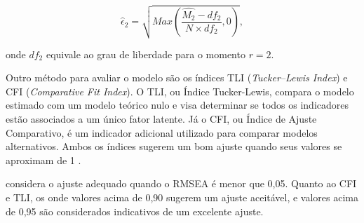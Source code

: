 \[
	\hat{\epsilon}_2 = \sqrt{Max\left(\frac{\hat{M_{2}} - df_{2}}
		{N \times df_{2}}, 0 \right) } ,
\]

\noindent onde $df_2$ equivale ao grau de liberdade para o momento $r = 2$.



\begin{comment}
	Outro método método para avaliar o modelo são os índices TLI  (\textit{Tucker–Lewis Index}) e CFI (\textit{Comparative Fit Index}), TLI significa Índice Tucker-Lewis e CFI significa Índice de Ajuste Comparativo. O TLI  compara o modelo estimado com um modelo teórico nulo e visa determinar se todos os indicadores são
	associados a um único fator latente, o CFI é um indicador adicional que serve para comparar modelos alternativos \cite{boruchovitch2017dark}. Ambos os indicadores indicam modelos com bom ajustes quando seu valor próximos de 1 \cite{hair2009multivariada}). 
\end{comment}


Outro método para avaliar o modelo são os índices TLI (\textit{Tucker–Lewis Index}) e CFI (\textit{Comparative Fit Index}). O TLI, ou Índice Tucker-Lewis, compara o modelo estimado com um modelo teórico nulo e visa determinar se todos os indicadores estão associados a um único fator latente. Já o CFI, ou Índice de Ajuste Comparativo, é um indicador adicional utilizado para comparar modelos alternativos. Ambos os índices sugerem um bom ajuste quando seus valores se aproximam de 1 \cite{hair2009multivariada}.

 considera o ajuste adequado quando o RMSEA é menor que 0,05. Quanto ao CFI e TLI, os onde valores acima de 0,90 sugerem um ajuste aceitável, e valores acima de 0,95 são considerados indicativos de um excelente ajuste.

